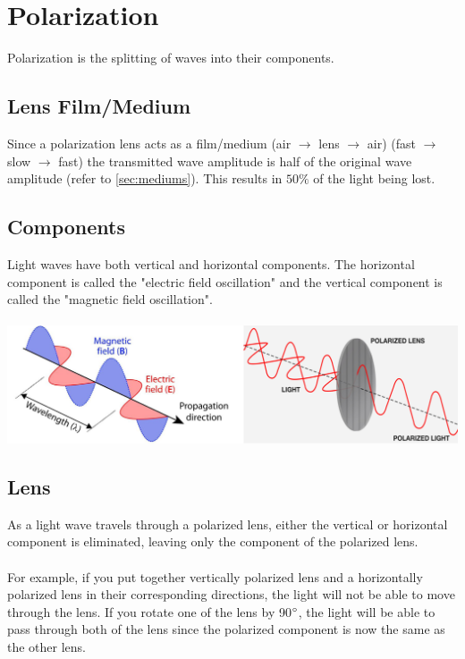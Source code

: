 \documentclass{article}
\begin{document}
\section{Polarization}
Polarization is the splitting of waves into their components.

\subsection{Lens Film/Medium}
Since a polarization lens acts as a film/medium (air $\to$ lens $\to$ air) (fast $\to$ slow $\to$ fast) the transmitted wave amplitude is half of the original wave amplitude (refer to \cref{sec:mediums}). This results in $50\%$ of the light being lost.

\subsection{Components}
Light waves have both vertical and horizontal components. The horizontal component is called the "electric field oscillation" and the vertical component is called the "magnetic field oscillation".\\\\
\includegraphics[scale=0.45]{images/polarization} \\

\vspace{4cm}

\subsection{Lens}
\noindent As a light wave travels through a polarized lens, either the vertical or horizontal component is eliminated, leaving only the component of the polarized lens.\\\\
For example, if you put together vertically polarized lens and a horizontally polarized lens in their corresponding directions, the light will not be able to move through the lens.
If you rotate one of the lens by 90$\degree$, the light will be able to pass through both of the lens since the polarized component is now the same as the other lens.
\end{document}
